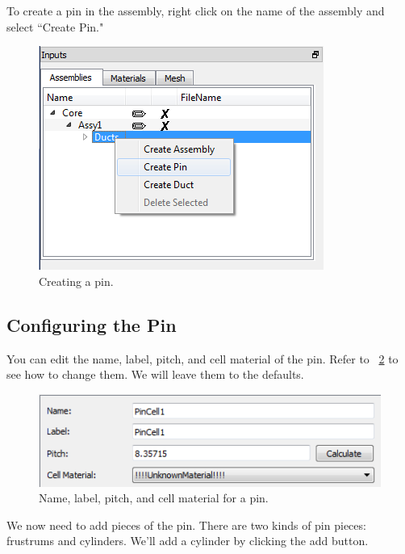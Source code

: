 To create a pin in the assembly, right click on the name of the assembly and select ``Create Pin."

\begin{figure}[H]
	\begin{center}
		\includegraphics[width=0.5\linewidth]{Images/hex-9.png}
		\caption{Creating a pin.}
		\label{fig:Hex9}
	\end{center}
\end{figure}

\subsection{Configuring the Pin}

You can edit the name, label, pitch, and cell material of the pin.  Refer to ~\ref{fig:Hex10} to see how to change them.  We will leave them to the defaults.

\begin{figure}[H]
	\begin{center}
		\includegraphics[width=0.5\linewidth]{Images/hex-10.png}
		\caption{Name, label, pitch, and cell material for a pin.}
		\label{fig:Hex10}
	\end{center}
\end{figure}

We now need to add pieces of the pin.  There are two kinds of pin pieces: frustrums and cylinders.  We'll add a cylinder by clicking the add button.

